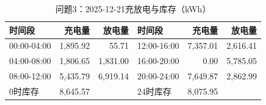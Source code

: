 \begin{table}[H]\centering\small\caption{问题3：2025-12-21充放电与库存（kWh）}\label{tab:q320251221b}
\begin{tabular}{lrrlrr}\toprule
时间段 & 充电量 & 放电量 & 时间段 & 充电量 & 放电量\\\midrule
00:00-04:00 & 1,895.92 & 55.71 & 12:00-16:00 & 7,357.01 & 2,616.41\\
04:00-08:00 & 1,806.65 & 1,831.00 & 16:00-20:00 & 0.00 & 5,785.05\\
08:00-12:00 & 5,435.79 & 6,919.14 & 20:00-24:00 & 7,649.87 & 2,862.99\\
0时库存 & 8,645.57 &  & 24时库存 & 8,075.95 & \\
\bottomrule\end{tabular}\end{table}
